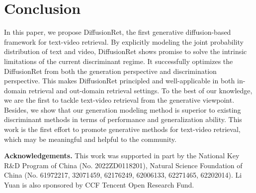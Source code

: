 \documentclass[10pt,twocolumn,letterpaper]{article}
\begin{document}
{\section{Conclusion}
In this paper, we propose DiffusionRet, the first generative diffusion-based framework for text-video retrieval. By explicitly modeling the joint probability distribution of text and video, DiffusionRet shows promise to solve the intrinsic limitations of the current discriminant regime. It successfully optimizes the DiffusionRet from both the generation perspective and discrimination perspective. This makes DiffusionRet principled and well-applicable in both in-domain retrieval and out-domain retrieval settings. To the best of our knowledge, we are the first to tackle text-video retrieval from the generative viewpoint. Besides, we show that our generation modeling method is superior to existing discriminant methods in terms of performance and generalization ability. This work is the first effort to promote generative methods for text-video retrieval, which may be meaningful and helpful to the community.

\noindent \textbf{Acknowledgements.} This work was supported in part by the National Key R\&D Program of China (No. 2022ZD0118201), Natural Science Foundation of China (No. 61972217, 32071459, 62176249, 62006133, 62271465, 62202014). Li Yuan is also sponsored by CCF Tencent Open Research Fund.

{\small


}

\appendix

\renewcommand{\thefootnote}{\fnsymbol{footnote}}

\renewcommand{\thetable}{\Alph{table}}
\renewcommand{\theequation}{\Alph{equation}}
\renewcommand{\thefigure}{\Alph{figure}}

\setcounter{table}{0}
\setcounter{section}{0}
\setcounter{figure}{0}
\setcounter{equation}{0}

}
\end{document}

